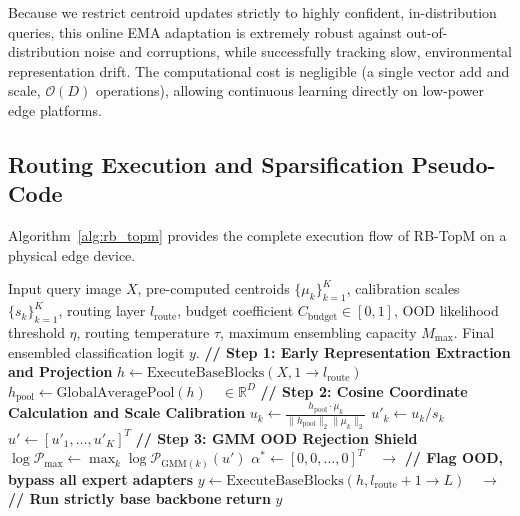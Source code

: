 \documentclass{article}
\theoremstyle{plain}
\theoremstyle{definition}
\theoremstyle{remark}
\begin{document}
Because we restrict centroid updates strictly to highly confident, in-distribution queries, this online EMA adaptation is extremely robust against out-of-distribution noise and corruptions, while successfully tracking slow, environmental representation drift. The computational cost is negligible (a single vector add and scale, $\mathcal{O}(D)$ operations), allowing continuous learning directly on low-power edge platforms.

\subsection{Routing Execution and Sparsification Pseudo-Code}
Algorithm~\ref{alg:rb_topm} provides the complete execution flow of RB-TopM on a physical edge device.

\begin{algorithm}[tb]
\caption{Resource-Budgeted Top-$M$ Expert Serving (RB-TopM)}
\label{alg:rb_topm}
\begin{algorithmic}[1]
 Input query image $X$, pre-computed centroids $\{\mu_k\}_{k=1}^K$, calibration scales $\{s_k\}_{k=1}^K$, routing layer $l_{\text{route}}$, budget coefficient $C_{\text{budget}} \in [0, 1]$, OOD likelihood threshold $\eta$, routing temperature $\tau$, maximum ensembling capacity $M_{\max}$.
 Final ensembled classification logit $y$.
\vspace{0.05in}
\STATE \textbf{// Step 1: Early Representation Extraction and Projection}
\STATE $h \gets \text{ExecuteBaseBlocks}(X, 1 \to l_{\text{route}})$
\STATE $h_{\text{pool}} \gets \text{GlobalAveragePool}(h) \quad \in \mathbb{R}^D$
\vspace{0.05in}
\STATE \textbf{// Step 2: Cosine Coordinate Calculation and Scale Calibration}
    \STATE $u_k \gets \frac{h_{\text{pool}} \cdot \mu_k}{\|h_{\text{pool}}\|_2 \|\mu_k\|_2}$
    \STATE $u'_k \gets u_k / s_k$
\ENDFOR
\STATE $u' \gets [u'_1, \dots, u'_K]^T$
\vspace{0.05in}
\STATE \textbf{// Step 3: GMM OOD Rejection Shield}
\STATE $\log \mathcal{P}_{\text{max}} \gets \max_{k} \log \mathcal{P}_{\text{GMM}(k)}(u')$
    \STATE $\alpha^* \gets [0, 0, \dots, 0]^T \quad \to$ \textbf{// Flag OOD, bypass all expert adapters}
    \STATE $y \gets \text{ExecuteBaseBlocks}(h, l_{\text{route}}+1 \to L) \quad \to$ \textbf{// Run strictly base backbone}
    \STATE \textbf{return} $y$
\ENDIF
\vspace{0.05in}

\end{algorithmic}
\end{algorithm}
\end{document}
